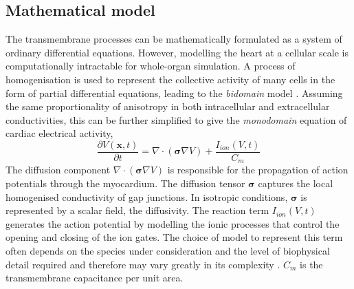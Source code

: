 \documentclass[utf8]{frontiersSCNS} %
\begin{document}
\subsection{Mathematical model}
\label{sec:methods:mathematical_model}
The transmembrane processes can be mathematically formulated as a system of ordinary differential equations. However, modelling the heart at a cellular scale is computationally intractable for whole-organ simulation. A process of homogenisation is used to represent the collective activity of many cells in the form of partial differential equations, leading to the \textit{bidomain} model \cite[p.~553-568]{Keener2013MathematicalPhysiology}.
Assuming the same proportionality of anisotropy in both intracellular and extracellular conductivities, this can be further simplified to give the \textit{monodomain} equation of cardiac electrical activity,
\begin{equation}
    \frac{\partial V(\boldsymbol{x}, t)}{\partial t} = \nabla \cdot (\boldsymbol{\sigma}\nabla V) + \frac{I_{ion}(V, t)}{C_m}
\end{equation}
The diffusion component $\nabla \cdot (\boldsymbol{\sigma}\nabla V)$ is responsible for the propagation of action potentials through the myocardium. The diffusion tensor $\boldsymbol{\sigma}$ captures the local homogenised conductivity of gap junctions. In isotropic conditions, $\boldsymbol{\sigma}$ is represented by a scalar field, the diffusivity.
The reaction term $I_{ion}(V, t)$ generates the action potential by modelling the ionic processes that control the opening and closing of the ion gates. The choice of model to represent this term often depends on the species under consideration and the level of biophysical detail required and therefore may vary greatly in its complexity \cite[]{clayton2011models}. $C_m$ is the transmembrane capacitance per unit area.
\end{document}
